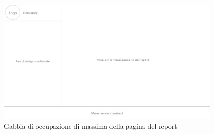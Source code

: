 \begin{figure}[H]
	\centering
	\caption{Gabbia di occupazione di massima della pagina del report.}
	\label{fig:gabbie-massima:report}
	\includegraphics[width=\textwidth]{images/gabbie-di-massima/Report}
\end{figure}
